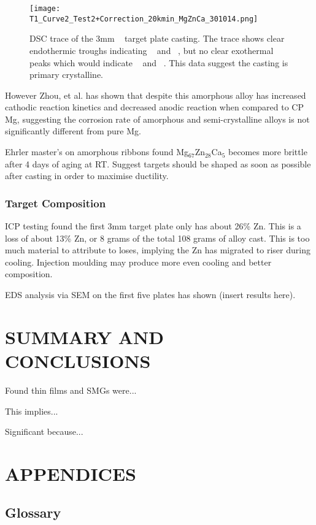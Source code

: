 \documentclass[a4paper,12pt,oneside]{report}%
\begin{document}
\begin{figure}[htbp]
	\centering
	\texttt{[image: T1\_Curve2\_Test2+Correction\_20kmin\_MgZnCa\_301014.png]}
	\caption{DSC trace of the 3mm \MgZnCa~ target plate casting. The trace shows clear endothermic troughs indicating  \Tm~  and \Tl~, but no clear exothermal peaks which would indicate \Tg~  and \Tx~. This data suggest the casting is primary crystalline.}
	\label{fig:DSCTarget1}
\end{figure}

However Zhou, et al. \cite{Zhou2013} has shown that despite this amorphous alloy has increased cathodic reaction kinetics and decreased anodic reaction when compared to CP Mg, suggesting the corrosion rate of amorphous and semi-crystalline alloys is not significantly different from pure Mg. 

Ehrler \cite{Ehrler2008} master's on amorphous ribbons found Mg$_{67}$Zn$_{28}$Ca$_{5}$ becomes more brittle after 4 days of aging at RT. Suggest targets should be shaped as soon as possible after casting in order to maximise ductility. 

\subsection{Target Composition}

ICP testing found the first 3mm target plate only has about 26\% Zn. This is a loss of about 13\% Zn, or 8 grams of the total 108 grams of alloy cast.  This is too much material to attribute to loses, implying the Zn has migrated to riser during cooling. Injection moulding may produce more even cooling and better composition. 

EDS analysis via SEM on the first five plates has shown (insert results here). 

\chapter{SUMMARY AND CONCLUSIONS}
Found thin films and SMGs were...

This implies...

Significant because...




\chapter{APPENDICES}
\section{Glossary}
\end{document}
